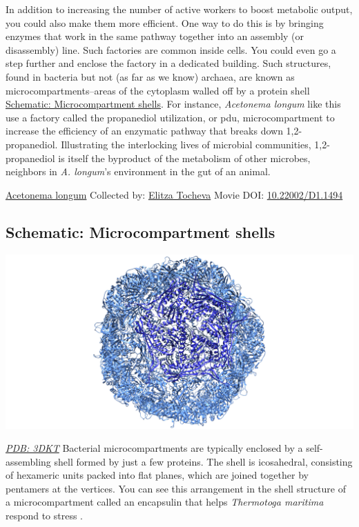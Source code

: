 \documentclass[]{tufte-book}
\begin{document}
In addition to increasing the number of active workers to boost metabolic output, you could also make them more efficient. One way to do this is by bringing enzymes that work in the same pathway together into an assembly (or disassembly) line. Such factories are common inside cells. You could even go a step further and enclose the factory in a dedicated building. Such structures, found in bacteria but not (as far as we know) archaea, are known as microcompartments--areas of the cytoplasm walled off by a protein shell \protect\hyperlink{Microcompartment_shells}{Schematic: Microcompartment shells}. For instance, \emph{Acetonema longum} like this use a factory called the propanediol utilization, or pdu, microcompartment to increase the efficiency of an enzymatic pathway that breaks down 1,2-propanediol. Illustrating the interlocking lives of microbial communities, 1,2-propanediol is itself the byproduct of the metabolism of other microbes, neighbors in \emph{A. longum}'s environment in the gut of an animal.



\hypertarget{htmlwidget-eabf7496c271fc24371a}{}

\label{fig:4-6}\protect\hyperlink{tree}{Acetonema longum} Collected by: \protect\hyperlink{elitza_tocheva}{Elitza Tocheva} Movie DOI: \href{https://doi.org/10.22002/D1.1494}{10.22002/D1.1494}

\hypertarget{Microcompartment_shells}{%
\subsection*{Schematic: Microcompartment shells}\label{Microcompartment_shells}}

\includegraphics{img/schematics/4_6_1}

\href{http://rcsb.org/structure/3DKT}{\emph{PDB: 3DKT}}
Bacterial microcompartments are typically enclosed by a self-assembling shell formed by just a few proteins. The shell is icosahedral, consisting of hexameric units packed into flat planes, which are joined together by pentamers at the vertices. You can see this arrangement in the shell structure of a microcompartment called an encapsulin that helps \emph{Thermotoga maritima} respond to stress \citep{sutter2008}.
\end{document}
